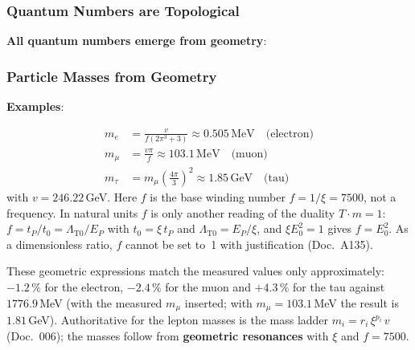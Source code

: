 	\subsubsection{Quantum Numbers are Topological}

	\textbf{All quantum numbers emerge from geometry}:

	\begin{center}
	\end{center}

	\subsubsection{Particle Masses from Geometry}

	\textbf{Examples}:

	\begin{align}
		m_e &= \frac{v}{f(2\pi^3 + 3)} \approx 0.505\,\text{MeV} \quad \text{(electron)} \\
		m_\mu &= \frac{v\pi}{f} \approx 103.1\,\text{MeV} \quad \text{(muon)} \\
		m_\tau &= m_\mu \left(\frac{4\pi}{3}\right)^2 \approx 1.85\,\text{GeV} \quad \text{(tau)}
	\end{align}
	with $v = 246.22$\,GeV. Here $f$ is the base winding number $f = 1/\xi = 7500$, not a frequency. In natural units $f$ is only another reading of the duality $T\cdot m = 1$: $f = t_P/t_0 = \Lambda_{\text{T0}}/E_P$ with $t_0 = \xi\,t_P$ and $\Lambda_{\text{T0}} = E_P/\xi$, and $\xi E_0^2 = 1$ gives $f = E_0^2$. As a dimensionless ratio, $f$ cannot be set to~1 with justification (Doc.~A135).

	These geometric expressions match the measured values only approximately: $-1.2\,\%$ for the electron, $-2.4\,\%$ for the muon and $+4.3\,\%$ for the tau against $1776.9$\,MeV (with the measured $m_\mu$ inserted; with $m_\mu = 103.1$\,MeV the result is $1.81$\,GeV). Authoritative for the lepton masses is the mass ladder $m_i = r_i\,\xi^{p_i}\,v$ (Doc.~006); the masses follow from \textbf{geometric resonances} with $\xi$ and $f = 7500$.

